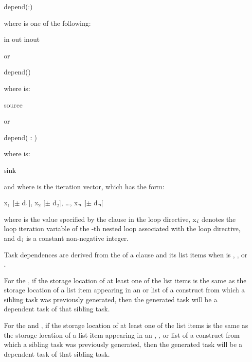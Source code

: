 {{{{\begin{boxedcode}
depend(:)
\end{boxedcode}

where  is one of the following:
\begin{indentedcodelist}
in
out
inout
\end{indentedcodelist}

or

\begin{boxedcode}
depend()
\end{boxedcode}

where  is:
\begin{indentedcodelist}
source
\end{indentedcodelist}

or

\begin{boxedcode}
depend( : )
\end{boxedcode}

where  is:
\begin{indentedcodelist}
sink
\end{indentedcodelist}

and where  is the iteration vector, which has the form:

x$_{1}$ [$\pm $ d$_{1}$], x$_{2}$ [$\pm $ d$_{2}$], \ldots, x$_{{\textrm{\textmd{\itshape{n}}}}}$ [$\pm $ d$_{{\textrm{\textmd{\itshape{n}}}}}$]

where  is the value specified by the  clause in the loop
directive, x$_{{\textrm{\textmd{\itshape{i}}}}}$ denotes the loop iteration variable of the -th
nested loop associated with the loop directive, and d$_{{\textrm{\textmd{\itshape{i}}}}}$ is a
constant non-negative integer.

\descr
Task dependences are derived from the  of a  clause and its list 
items when  is , , or .

For the  , if the storage location of at least one
of the list items is the same as the storage location of a list item appearing
in an  or   list of a  construct
from which a sibling task was previously generated, then the generated task
will be a dependent task of that sibling task.

For the  and  , if the storage location of at least one
of the list items is the same as the storage location of a list item appearing
in an , , or   list of
a  construct from which a sibling task was previously generated, then the
generated task will be a dependent task of that sibling task.

}}}}

